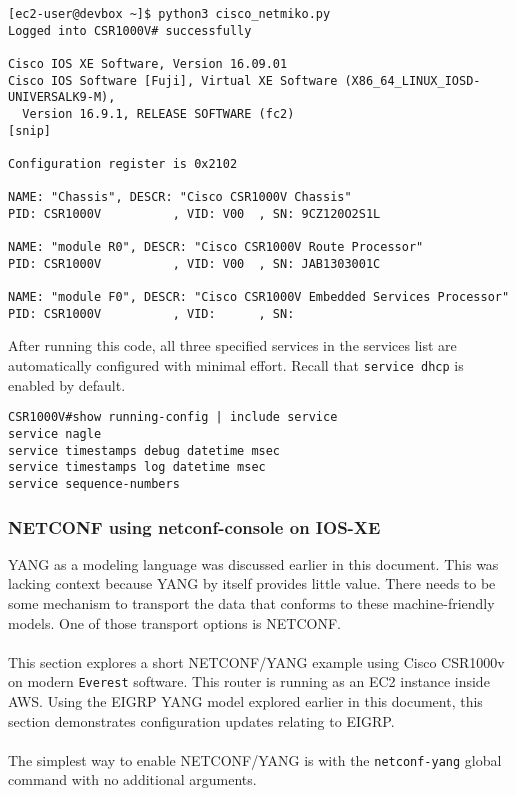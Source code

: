 \begin{verbatim}
[ec2-user@devbox ~]$ python3 cisco_netmiko.py
Logged into CSR1000V# successfully

Cisco IOS XE Software, Version 16.09.01
Cisco IOS Software [Fuji], Virtual XE Software (X86_64_LINUX_IOSD-UNIVERSALK9-M),
  Version 16.9.1, RELEASE SOFTWARE (fc2)
[snip]

Configuration register is 0x2102

NAME: "Chassis", DESCR: "Cisco CSR1000V Chassis"
PID: CSR1000V          , VID: V00  , SN: 9CZ120O2S1L

NAME: "module R0", DESCR: "Cisco CSR1000V Route Processor"
PID: CSR1000V          , VID: V00  , SN: JAB1303001C

NAME: "module F0", DESCR: "Cisco CSR1000V Embedded Services Processor"
PID: CSR1000V          , VID:      , SN:
\end{verbatim}

After running this code, all three specified services in the services list are
automatically configured with minimal effort. Recall that \verb|service dhcp|
is enabled by default.

\begin{verbatim}
CSR1000V#show running-config | include service
service nagle
service timestamps debug datetime msec
service timestamps log datetime msec
service sequence-numbers
\end{verbatim}

\subsubsection{NETCONF using netconf-console on IOS-XE}
YANG as a modeling language was discussed earlier in this document. This was
lacking context because YANG by itself provides little value. There needs to
be some mechanism to transport the data that conforms to these
machine-friendly models. One of those transport options is NETCONF.
\\ \\
This section explores a short NETCONF/YANG example using Cisco CSR1000v on
modern \verb|Everest| software. This router is running as an EC2 instance inside
AWS. Using the EIGRP YANG model explored earlier in this document, this
section demonstrates configuration updates relating to EIGRP.
\\ \\
The simplest way to enable NETCONF/YANG is with the \verb|netconf-yang| global
command with no additional arguments.

